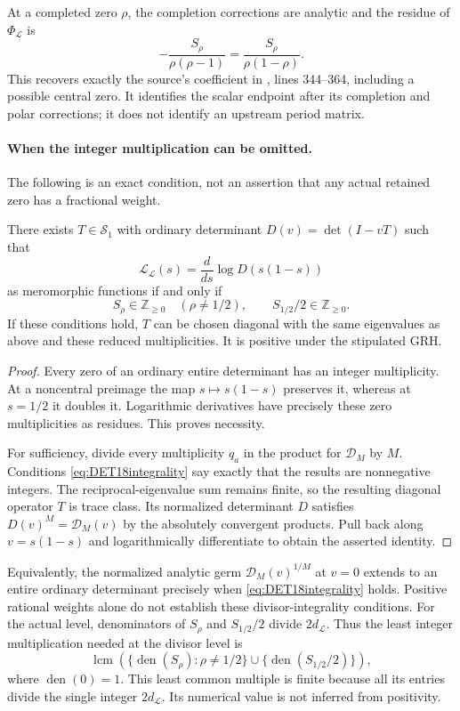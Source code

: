 At a completed zero $\rho$, the completion corrections are analytic
and the residue of $\Phi_{\mathcal L}$ is
\[
 -\frac{S_\rho}{\rho(\rho-1)}
 =\frac{S_\rho}{\rho(1-\rho)}.
\]
This recovers exactly the source's coefficient in
, lines 344--364, including a possible central
zero. It identifies the scalar endpoint after its completion and
polar corrections; it does not identify an upstream period matrix.

\paragraph{When the integer multiplication can be omitted.}
The following is an exact condition, not an assertion that any
actual retained zero has a fractional weight.
\begin{proposition}
There exists $T\in\mathcal S_1$ with ordinary determinant
$D(v)=\det(I-vT)$ such that
\[
 \mathscr L_{\mathcal L}(s)
 =\frac{d}{ds}\log D(s(1-s))
\]
as meromorphic functions if and only if
\begin{equation}\label{eq:DET18integrality}
 S_\rho\in\mathbb Z_{\ge0}\quad(\rho\ne1/2),\qquad
 S_{1/2}/2\in\mathbb Z_{\ge0}.
\end{equation}
If these conditions hold, $T$ can be chosen diagonal with the same
eigenvalues as above and these reduced multiplicities. It is positive
under the stipulated GRH.
\end{proposition}
\begin{proof}
Every zero of an ordinary entire determinant has an integer
multiplicity. At a noncentral preimage the map $s\mapsto s(1-s)$
preserves it, whereas at $s=1/2$ it doubles it. Logarithmic
derivatives have precisely these zero multiplicities as residues.
This proves necessity.

For sufficiency, divide every multiplicity $q_a$ in the product for
$\mathscr D_M$ by $M$. Conditions
\eqref{eq:DET18integrality} say exactly that the results are
nonnegative integers. The reciprocal-eigenvalue sum remains finite,
so the resulting diagonal operator $T$ is trace class. Its
normalized determinant $D$ satisfies $D(v)^M=\mathscr D_M(v)$ by
the absolutely convergent products. Pull back along $v=s(1-s)$
and logarithmically differentiate to obtain the asserted identity.
\end{proof}

Equivalently, the normalized analytic germ
$\mathscr D_M(v)^{1/M}$ at $v=0$ extends to an entire ordinary
determinant precisely when \eqref{eq:DET18integrality} holds.
Positive rational weights alone do not establish these
divisor-integrality conditions. For the actual level, denominators
of $S_\rho$ and $S_{1/2}/2$ divide $2d_{\mathcal L}$. Thus the least
integer multiplication needed at the divisor level is
\[
 \operatorname{lcm}\left(
 \{\operatorname{den}(S_\rho):\rho\ne1/2\}
 \cup\{\operatorname{den}(S_{1/2}/2)\}\right),
\]
where $\operatorname{den}(0)=1$. This least common multiple is
finite because all its entries divide the single integer
$2d_{\mathcal L}$. Its numerical value is not inferred from
positivity.

